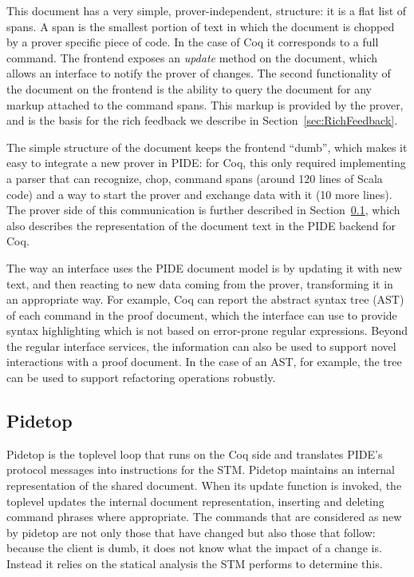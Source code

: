 \documentclass[runningheads,a4paper,oribibl]{llncs}
\begin{document}
This document has a very simple, prover-independent, structure: it is a flat
list of spans.  A span is the smallest portion of text in which the
document is chopped by a prover specific piece of code.  In the case of Coq it
corresponds to a full command.
The frontend exposes an \emph{update} method on the
document, which allows an interface to notify the prover of changes. The
second functionality of the document on the frontend is the ability to query
the document for any markup attached to the command spans. This markup is
provided by the prover, and is the basis for the rich feedback we describe in
Section~\ref{sec:RichFeedback}.

The simple structure of the document keeps the frontend ``dumb'', which makes it
easy to integrate a new prover in PIDE: for Coq, this only required
implementing a parser that can recognize, chop, command spans (around
120 lines of Scala code) and a way to start the
prover and exchange data with it (10 more lines). 
The prover side of this communication is further
described in Section~\ref{sec:PIDETop}, which also describes the
representation of the document text in the PIDE backend for Coq.

The way an interface uses the PIDE document model is by updating it with new
text, and then reacting to new data coming from the prover, transforming it in
an appropriate way. For example, Coq can report the abstract syntax tree (AST)
of each command in the proof document, which the interface can use to provide
syntax highlighting which is not based on error-prone regular expressions.
Beyond the regular interface services, the information can also be used to
support novel interactions with a proof document. In the case of an AST, for
example, the tree can be used to support refactoring operations
robustly.

\subsection{Pidetop}\label{sec:PIDETop}

Pidetop is the toplevel loop that runs on the Coq side and translates
PIDE's protocol messages into instructions for the STM. Pidetop
maintains an internal representation of the shared document. When its
update function is invoked, the toplevel updates the internal document
representation, inserting and deleting command phrases where
appropriate.  The commands that are considered as new by pidetop are
not only those that have changed but also those that follow: because
the client is dumb, it does not know what the impact of a change is.
Instead it relies on the statical analysis the STM performs to
determine this.
\end{document}
